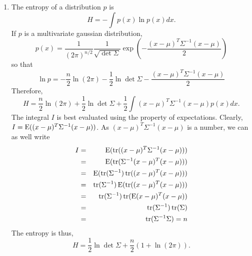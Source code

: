 \begin{enumerate}
\item The entropy of a distribution $p$ is
\[
H = -\int p(x)\ln p(x)dx.
\]
If $p$ is a multivariate gaussian distribution,
\[
p(x) = \frac{1}{(2\pi)^{n/2}}\frac{1}{\sqrt{\det\Sigma}}\exp\left(-\frac{(x - \mu)^T\Sigma^{-1}(x - \mu)}{2}\right)
\]
so that
\[
\ln p = -\frac{n}{2}\ln(2\pi) - \frac{1}{2}\ln\det\Sigma - \frac{(x - \mu)^T\Sigma^{-1}(x - \mu)}{2}
\]
Therefore,
\[
H = \frac{n}{2}\ln(2\pi) + \frac{1}{2}\ln\det\Sigma + \frac{1}{2}\int(x - \mu)^T\Sigma^{-1}(x - \mu)p(x)dx.
\]
The integral $I$ is best evaluated using the property of expectations. Clearly, $I = \operatorname{E}((x-\mu)^T\Sigma^{-1}(x-\mu))$.
As $(x-\mu)^T\Sigma^{-1}(x-\mu)$ is a number, we can as well write
\begin{eqnarray*}
I &=& \operatorname{E}(\operatorname{tr}((x - \mu)^T\Sigma^{-1}(x - \mu))) \\
  &=& \operatorname{E}(\operatorname{tr}(\Sigma^{-1}(x - \mu)^T(x - \mu))) \\
  &=& \operatorname{E}(\operatorname{tr}(\Sigma^{-1})\operatorname{tr}((x - \mu)^T(x - \mu))) \\
  &=& \operatorname{tr}(\Sigma^{-1})\operatorname{E}(\operatorname{tr}((x - \mu)^T(x - \mu))) \\
  &=& \operatorname{tr}(\Sigma^{-1})\operatorname{tr}(\operatorname{E}(x - \mu)^T(x - \mu)) \\
  &=& \operatorname{tr}(\Sigma^{-1})\operatorname{tr}(\Sigma) \\
  &=& \operatorname{tr}(\Sigma^{-1}\Sigma) = n
\end{eqnarray*}
The entropy is thus,
\[
H = \frac{1}{2}\ln\det\Sigma + \frac{n}{2}\left(1 + \ln(2\pi)\right).
\]


\end{enumerate}
